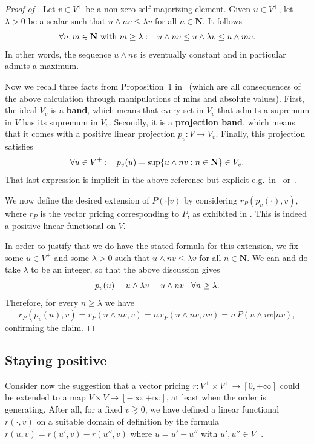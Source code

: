 \documentclass[11pt]{amsart}
\numberwithin{equation}{section}
\theoremstyle{definition}
\theoremstyle{definition}
\newcommand*{\NN}{\mathbf{N}}
\begin{document}
\begin{proof}[Proof of ]
Let $v\in V^+$ be a non-zero self-majorizing element. Given $u\in V^+$, let $\lambda>0$ be a scalar such that $u \wedge n v \leq \lambda v$ for all $n\in\NN$. It follows
\begin{equation*}
\forall n, m\in \NN \text{ with } m\geq \lambda : \kern3mm u \wedge n v \leq u \wedge \lambda v \leq  u \wedge m v.
\end{equation*}
In other words, the sequence $u \wedge n v$ is eventually constant and in particular admits a maximum.

Now we recall three facts from Proposition~1 in~\cite{Feldman-Porter} (which are all consequences of the above calculation through manipulations of mins and absolute values). First, the ideal $V_v$ is a \textbf{band}, which means that every set in $V_v$ that admits a supremum in $V$ has its supremum in $V_v$. Secondly, it is a \textbf{projection band}, which means that it comes with a positive linear projection $p_v\colon V \to V_v$. Finally, this projection satisfies
\begin{equation*}
\forall u\in V^+: \kern3mm p_v(u) = \sup\{ u \wedge n v : n\in \NN\} \in V_v.
\end{equation*}
That last expression is implicit in the above reference but explicit e.g.\ in~\cite[Theorem~24.7]{Luxemburg-Zaanen} or~\cite[Theorem~1.46]{Aliprantis-Burkinshaw}.

We now define the desired extension of $P(\cdot|v)$ by considering $r_P(p_v(\cdot), v)$, where $r_P$ is the vector pricing corresponding to $P$, as exhibited in . This is indeed a positive linear functional on $V$.

In order to justify that we do have the stated formula for this extension, we fix some $u\in V^+$ and some $\lambda>0$ such that $u \wedge n v \leq \lambda v$ for all $n\in\NN$. We can and do take $\lambda$ to be an integer, so that the above discussion gives
\begin{equation*}
 p_v(u) = u \wedge \lambda v = u \wedge n v \kern3mm \forall n\geq \lambda.
\end{equation*}
Therefore, for every $n\geq \lambda$ we have
\begin{equation*}
r_P(p_v(u), v) = r_P(u \wedge n v, v) = n \, r_P(u \wedge n v, n v) = n\, P(u \wedge n v| n v),
\end{equation*}
confirming the claim.
\end{proof}


\subsection{Staying positive}\label{sec:negative}%
Consider now the suggestion that a vector pricing $r\colon V^+ \times V^+\to [0, +\infty]$ could be extended to a map $V\times V \to [-\infty, +\infty]$, at least when the order is generating. After all, for a fixed $v\gneqq 0$, we have defined a linear functional $r(\cdot, v)$ on a suitable domain of definition by the formula $r(u,v) = r(u', v) - r(u'', v)$ where $u=u'-u''$ with $u', u'' \in V^+$.
\end{document}
